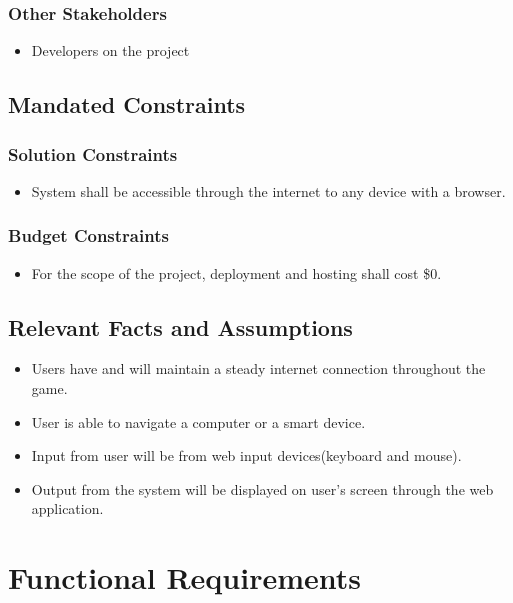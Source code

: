 \documentclass[12pt, titlepage]{article}
\begin{document}
\subsubsection{Other Stakeholders}
\begin{itemize}
    \item Developers on the project
\end{itemize}

\subsection{Mandated Constraints}

\subsubsection{Solution Constraints}
\begin{itemize}
    \item System shall be accessible through the internet to any device with a browser.
\end{itemize}

\subsubsection{Budget Constraints}
\begin{itemize}
    \item For the scope of the project, deployment and hosting shall cost \$0.
\end{itemize}



\subsection{Relevant Facts and Assumptions}
\begin{itemize}
    \item Users have and will maintain a steady internet connection throughout the game.
    \item User is able to navigate a computer or a smart device.
    \item Input from user will be from web input devices(keyboard and mouse).
    \item Output from the system will be displayed on user's screen through the web application.
\end{itemize}

\section{Functional Requirements}
\end{document}
